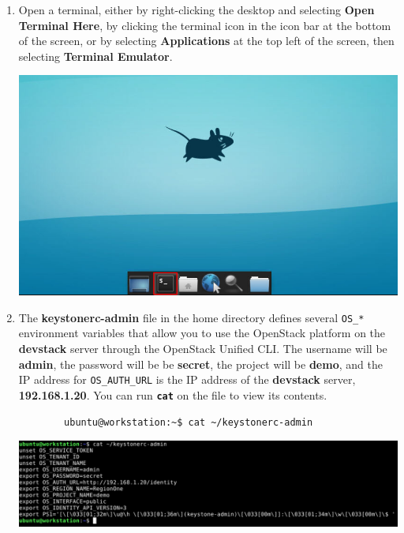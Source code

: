 \documentclass[letterpaper, 12pt]{article}
\begin{document}
\begin{enumerate}
    \item Open a terminal, either by right-clicking the desktop and selecting \textbf{Open Terminal Here}, by clicking
    the terminal icon in the icon bar at the bottom of the screen, or by selecting \textbf{Applications} at the top
    left of the screen, then selecting \textbf{Terminal Emulator}.

    \begin{center}
        \includegraphics[width=\linewidth]{images/part2/step1.png}
    \end{center}

    \item The \textbf{keystonerc-admin} file in the home directory defines several \texttt{OS\_*} environment variables
    that allow you to use the OpenStack platform on the \textbf{devstack} server through the OpenStack Unified
    CLI. The username will be \textbf{admin}, the password will be be \textbf{secret}, the project will be
    \textbf{demo}, and the IP address for \texttt{OS\_AUTH\_URL} is the IP address of the \textbf{devstack} server,
    \textbf{192.168.1.20}. You can run \textbf{\texttt{cat}} on the file to view its contents.
    \begin{lstlisting}
        ubuntu@workstation:~$ cat ~/keystonerc-admin
    \end{lstlisting}

    \begin{center}
        \includegraphics[width=\linewidth]{images/part2/step2.png}
    \end{center}


\end{enumerate}
\end{document}
